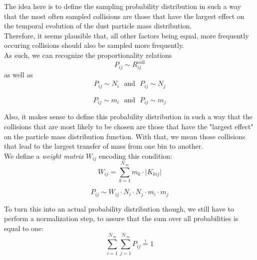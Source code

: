     The idea here is to define the sampling probability distribution in such a way that the most 
    often sampled collisions are those that have the largest effect on the temporal evolution of 
    the dust particle mass distribution. \\

    Therefore, it seems plausible that, all other factors being equal, more frequently occuring 
    collisions should also be sampled more frequently. \\

    As such, we can recognize the proportionality relations
    \begin{equation}
        P_{ij} \sim R^\text{coll}_{ij}
    \end{equation}
    as well as 
    \begin{align}
        P_{ij} \sim N_i 
        \ \ \ \text{and} \ \ \
        P_{ij} \sim N_j
    \end{align}

    \begin{equation}
        P_{ij} \sim m_i
        \ \ \ \text{and} \ \ \
        P_{ij} \sim m_j
    \end{equation}

    Also, it makes sense to define this probability distribution in such a way that the collisions 
    that are most likely to be chosen are those that have the "largest effect" on the particle mass 
    distribution function. With that, we mean those collisions that lead to the largest transfer of 
    mass from one bin to another. \\
    
    We define a \textit{weight matrix} $W_{ij}$ encoding this condition:
    \begin{equation} 
        W_{ij}
            = \sum_{k=1}^{\mathcal N_m} m_k \cdot \big|K_{kij}\big|
    \end{equation}

    \begin{equation}
        P_{ij}
            \sim W_{ij}\cdot N_i\cdot N_j\cdot m_i\cdot m_j
    \end{equation}

    To turn this into an actual probability distribution though, we still have to perform a 
    normalization step, to assure that the sum over all probabilities is equal to one:
    \begin{equation}
        \sum_{i=1}^{\mathcal N_m}\sum_{j=1}^{\mathcal N_m}P_{ij}
            \overset{!}{=}1
    \end{equation}

